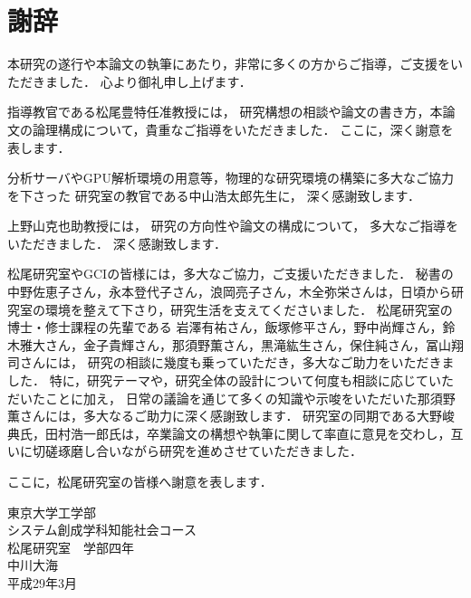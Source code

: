 \chapter*{謝辞}
\fancyhf{}
\rhead{}
\lhead{}
\cfoot{\thepage}

本研究の遂行や本論文の執筆にあたり，非常に多くの方からご指導，ご支援をいただきました．
心より御礼申し上げます．

指導教官である松尾豊特任准教授には，
研究構想の相談や論文の書き方，本論文の論理構成について，貴重なご指導をいただきました．
ここに，深く謝意を表します．

分析サーバやGPU解析環境の用意等，物理的な研究環境の構築に多大なご協力を下さった
研究室の教官である中山浩太郎先生に，
深く感謝致します．

上野山克也助教授には，
研究の方向性や論文の構成について，
多大なご指導をいただきました．
深く感謝致します．

松尾研究室やGCIの皆様には，多大なご協力，ご支援いただきました．
秘書の 中野佐恵子さん，永本登代子さん，浪岡亮子さん，木全弥栄さんは，日頃から研究室の環境を整えて下さり，研究生活を支えてくださいました．
松尾研究室の博士・修士課程の先輩である 岩澤有祐さん，飯塚修平さん，野中尚輝さん，鈴木雅大さん，金子貴輝さん，那須野薫さん，黒滝紘生さん，保住純さん，冨山翔司さんには，
研究の相談に幾度も乗っていただき，多大なご助力をいただきました．
特に，研究テーマや，研究全体の設計について何度も相談に応じていただいたことに加え，
日常の議論を通じて多くの知識や示唆をいただいた那須野薫さんには，多大なるご助力に深く感謝致します．
研究室の同期である大野峻典氏，田村浩一郎氏は，卒業論文の構想や執筆に関して率直に意見を交わし，互いに切磋琢磨し合いながら研究を進めさせていただきました．

ここに，松尾研究室の皆様へ謝意を表します．
\vvspace

\begin{flushright}
東京大学工学部\\
システム創成学科知能社会コース\\
松尾研究室　学部四年\\
中川大海\\
平成29年3月\\
\end{flushright}
